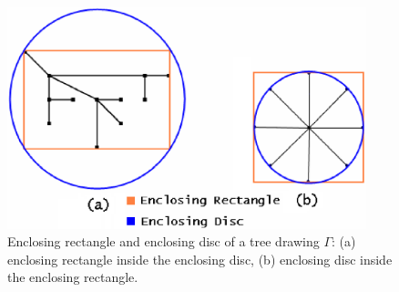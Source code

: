 \documentclass[]{article}
\begin{document}
{\begin{figure}[htb]
\centering
\includegraphics[width=4.1in]{images/enclosing_disc3}
\caption{Enclosing rectangle and enclosing disc of a tree drawing $\Gamma$: 
(a) enclosing rectangle inside the enclosing disc, (b) enclosing disc inside the enclosing rectangle.}
\label{fig_enclosing_disc}
\end{figure}

}
\end{document}
